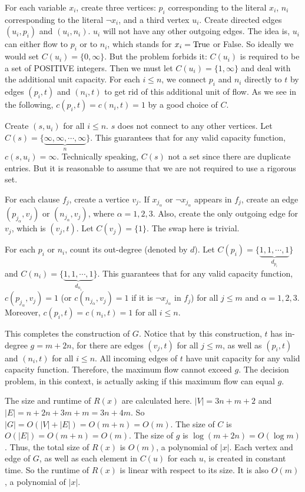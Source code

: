 \documentclass{article}
\begin{document}
For each variable $x_i$, create three vertices: $p_i$ corresponding to the literal $x_i$, $n_i$ corresponding to the literal $\neg x_i$, and a third vertex $u_i$. Create directed edges $(u_i,p_i)$ and $(u_i,n_i)$. $u_i$ will not have any other outgoing edges. The idea is, $u_i$ can either flow to $p_i$ or to $n_i$, which stands for $x_i=\textup{True}$ or False. So ideally we would set $C(u_i)=\{0,\infty\}$. But the problem forbids it: $C(u_i)$ is required to be a set of POSITIVE integers. Then we must let $C(u_i)=\{1,\infty\}$ and deal with the additional unit capacity. For each $i\leqslant n$, we connect $p_i$ and $n_i$ directly to $t$ by edges $(p_i,t)$ and $(n_i,t)$ to get rid of this additional unit of flow. As we see in the following, $c(p_i,t)=c(n_i,t)=1$ by a good choice of $C$.

Create $(s,u_i)$ for all $i\leqslant n$. $s$ does not connect to any other vertices. Let $C(s)=\{\underbrace{\infty,\infty,\cdots,\infty}_n\}$. This guarantees that for any valid capacity function, $c(s,u_i)=\infty$. Technically speaking, $C(s)$ not a set since there are duplicate entries. But it is reasonable to assume that we are not required to use a rigorous set.

For each clause $f_j$, create a vertice $v_j$. If $x_{j_\alpha}$ or $\neg x_{j_\alpha}$ appears in $f_j$, create an edge $(p_{j_\alpha},v_j)$ or $(n_{j_\alpha},v_j)$, where $\alpha=1,2,3$. Also, create the only outgoing edge for $v_j$, which is $(v_j,t)$. Let $C(v_j)=\{1\}$. The swap here is trivial.

For each $p_i$ or $n_i$, count its out-degree (denoted by $d$). Let $C(p_i)=\{\underbrace{1,1,\cdots,1}_{d_{p_i}}\}$ and $C(n_i)=\{\underbrace{1,1,\cdots,1}_{d_{n_i}}\}$. This guarantees that for any valid capacity function, $c(p_{j_\alpha},v_j)=1$ (or $c(n_{j_\alpha},v_j)=1$ if it is $\neg x_{j_\alpha}$ in $f_j$) for all $j\leqslant m$ and $\alpha=1,2,3$. Moreover, $c(p_i,t)=c(n_i,t)=1$ for all $i\leqslant n$.

This completes the construction of $G$. Notice that by this construction, $t$ has in-degree $g=m+2n$, for there are edges $(v_j,t)$ for all $j\leqslant m$, as well as $(p_i,t)$ and $(n_i,t)$ for all $i\leqslant n$. All incoming edges of $t$ have unit capacity for any valid capacity function. Therefore, the maximum flow cannot exceed $g$. The decision problem, in this context, is actually asking if this maximum flow can equal $g$.

The size and runtime of $R(x)$ are calculated here. $|V|=3n+m+2$ and $|E|=n+2n+3m+m=3n+4m$. So $|G|=O(|V|+|E|)=O(m+n)=O(m)$. The size of $C$ is $O(|E|)=O(m+n)=O(m)$. The size of $g$ is $\log(m+2n)=O(\log m)$. Thus, the total size of $R(x)$ is $O(m)$, a polynomial of $|x|$. Each vertex and edge of $G$, as well as each element in $C(u)$ for each $u$, is created in constant time. So the runtime of $R(x)$ is linear with respect to its size. It is also $O(m)$, a polynomial of $|x|$.
\end{document}
